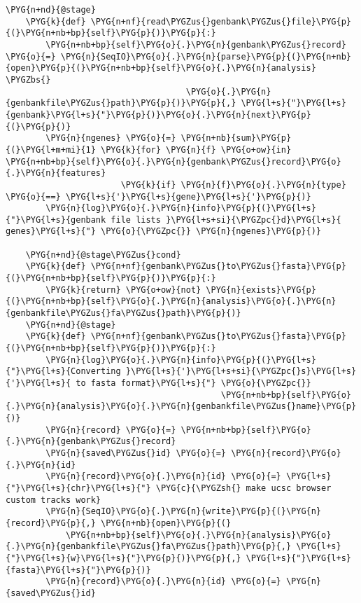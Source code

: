\begin{Verbatim}[commandchars=\\\{\}]
    \PYG{n+nd}{@stage}
    \PYG{k}{def} \PYG{n+nf}{read\PYGZus{}genbank\PYGZus{}file}\PYG{p}{(}\PYG{n+nb+bp}{self}\PYG{p}{)}\PYG{p}{:}
        \PYG{n+nb+bp}{self}\PYG{o}{.}\PYG{n}{genbank\PYGZus{}record} \PYG{o}{=} \PYG{n}{SeqIO}\PYG{o}{.}\PYG{n}{parse}\PYG{p}{(}\PYG{n+nb}{open}\PYG{p}{(}\PYG{n+nb+bp}{self}\PYG{o}{.}\PYG{n}{analysis} \PYGZbs{}
                                    \PYG{o}{.}\PYG{n}{genbankfile\PYGZus{}path}\PYG{p}{)}\PYG{p}{,} \PYG{l+s}{"}\PYG{l+s}{genbank}\PYG{l+s}{"}\PYG{p}{)}\PYG{o}{.}\PYG{n}{next}\PYG{p}{(}\PYG{p}{)}
        \PYG{n}{ngenes} \PYG{o}{=} \PYG{n+nb}{sum}\PYG{p}{(}\PYG{l+m+mi}{1} \PYG{k}{for} \PYG{n}{f} \PYG{o+ow}{in} \PYG{n+nb+bp}{self}\PYG{o}{.}\PYG{n}{genbank\PYGZus{}record}\PYG{o}{.}\PYG{n}{features}
                       \PYG{k}{if} \PYG{n}{f}\PYG{o}{.}\PYG{n}{type} \PYG{o}{==} \PYG{l+s}{'}\PYG{l+s}{gene}\PYG{l+s}{'}\PYG{p}{)}
        \PYG{n}{log}\PYG{o}{.}\PYG{n}{info}\PYG{p}{(}\PYG{l+s}{"}\PYG{l+s}{genbank file lists }\PYG{l+s+si}{\PYGZpc{}d}\PYG{l+s}{ genes}\PYG{l+s}{"} \PYG{o}{\PYGZpc{}} \PYG{n}{ngenes}\PYG{p}{)}

    \PYG{n+nd}{@stage\PYGZus{}cond}
    \PYG{k}{def} \PYG{n+nf}{genbank\PYGZus{}to\PYGZus{}fasta}\PYG{p}{(}\PYG{n+nb+bp}{self}\PYG{p}{)}\PYG{p}{:}
        \PYG{k}{return} \PYG{o+ow}{not} \PYG{n}{exists}\PYG{p}{(}\PYG{n+nb+bp}{self}\PYG{o}{.}\PYG{n}{analysis}\PYG{o}{.}\PYG{n}{genbankfile\PYGZus{}fa\PYGZus{}path}\PYG{p}{)}
    \PYG{n+nd}{@stage}
    \PYG{k}{def} \PYG{n+nf}{genbank\PYGZus{}to\PYGZus{}fasta}\PYG{p}{(}\PYG{n+nb+bp}{self}\PYG{p}{)}\PYG{p}{:}
        \PYG{n}{log}\PYG{o}{.}\PYG{n}{info}\PYG{p}{(}\PYG{l+s}{"}\PYG{l+s}{Converting }\PYG{l+s}{'}\PYG{l+s+si}{\PYGZpc{}s}\PYG{l+s}{'}\PYG{l+s}{ to fasta format}\PYG{l+s}{"} \PYG{o}{\PYGZpc{}}
                                           \PYG{n+nb+bp}{self}\PYG{o}{.}\PYG{n}{analysis}\PYG{o}{.}\PYG{n}{genbankfile\PYGZus{}name}\PYG{p}{)}
        \PYG{n}{record} \PYG{o}{=} \PYG{n+nb+bp}{self}\PYG{o}{.}\PYG{n}{genbank\PYGZus{}record}
        \PYG{n}{saved\PYGZus{}id} \PYG{o}{=} \PYG{n}{record}\PYG{o}{.}\PYG{n}{id}
        \PYG{n}{record}\PYG{o}{.}\PYG{n}{id} \PYG{o}{=} \PYG{l+s}{"}\PYG{l+s}{chr}\PYG{l+s}{"} \PYG{c}{\PYGZsh{} make ucsc browser custom tracks work}
        \PYG{n}{SeqIO}\PYG{o}{.}\PYG{n}{write}\PYG{p}{(}\PYG{n}{record}\PYG{p}{,} \PYG{n+nb}{open}\PYG{p}{(}
            \PYG{n+nb+bp}{self}\PYG{o}{.}\PYG{n}{analysis}\PYG{o}{.}\PYG{n}{genbankfile\PYGZus{}fa\PYGZus{}path}\PYG{p}{,} \PYG{l+s}{"}\PYG{l+s}{w}\PYG{l+s}{"}\PYG{p}{)}\PYG{p}{,} \PYG{l+s}{"}\PYG{l+s}{fasta}\PYG{l+s}{"}\PYG{p}{)}
        \PYG{n}{record}\PYG{o}{.}\PYG{n}{id} \PYG{o}{=} \PYG{n}{saved\PYGZus{}id}


\end{Verbatim}
